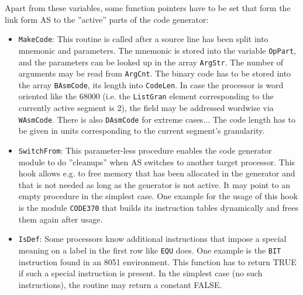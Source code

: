 \documentclass[12pt,twoside]{report}
\newcommand{\tty}[1]{{\tt #1}}
\newcommand{\asname}{{AS}}
\begin{document}
Apart from these variables, some function pointers have to be set that
form the link form \asname{} to the ''active'' parts of the code
generator:
\begin{itemize}
\item{\tty{MakeCode}: This routine is called after a source line has been
      split into mnemonic and parameters.  The mnemonic is stored into
      the variable \tty{OpPart}, and the parameters can be looked up in the
      array \tty{ArgStr}.  The number of arguments may be read from
      \tty{ArgCnt}.
      The binary code has to be stored into the array \tty{BAsmCode}, its
      length into \tty{CodeLen}.  In case the processor is word oriented
      like the 68000 (i.e. the \tty{ListGran} element corresponding to the
      currently active segment is 2), the field may be addressed
      wordwise via \tty{WAsmCode}.  There is also \tty{DAsmCode} for extreme
      cases... The code length has to be given in units corresponding
      to the current segment's granularity.}
\item{\tty{SwitchFrom}: This parameter-less procedure enables the code generator
      module to do ''cleanups'' when \asname{} switches to another target processor.
      This hook allows e.g. to free memory that has been allocated in the
      generator and that is not needed as long as the generator is not
      active.  It may point to an empty procedure in the simplest case.
      One example for the usage of this hook is the module \tty{CODE370} that
      builds its instruction tables dynamically and frees them again after
      usage.}
\item{\tty{IsDef}: Some processors know additional instructions that impose
      a special meaning on a label in the first row like \tty{EQU} does.  One
      example is the \tty{BIT} instruction found in an 8051 environment.  This
      function has to return TRUE if such a special instruction is
      present.  In the simplest case (no such instructions), the routine
      may return a constant FALSE.}
\end{itemize}
\end{document}

